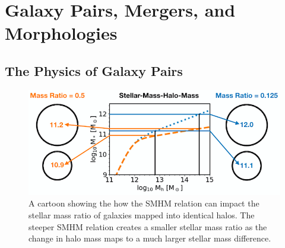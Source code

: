 
\chapter{Galaxy Pairs, Mergers, and Morphologies} %
\label{Chapter:GalPairs}

\section{The Physics of Galaxy Pairs}

\begin{figure}[h]
	\centering
	\includegraphics[width = \linewidth]{Figures/Chapter5/MassRatioCartoon.png}
	\caption{A cartoon showing the how the SMHM relation can impact the stellar mass ratio of galaxies mapped into identical halos. The steeper SMHM relation creates a smaller stellar mass ratio as the change in halo mass maps to a much larger stellar mass difference.}
	\label{fig:Mass_Ratio_Toon}
\end{figure}

